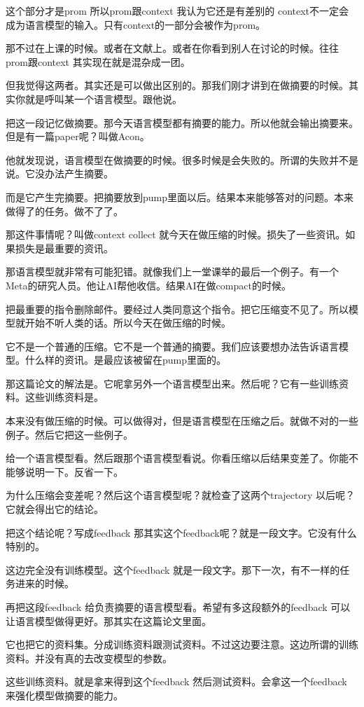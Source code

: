 \documentclass[12pt,a4paper]{article}
\begin{document}
这个部分才是prom 所以prom跟context 我认为它还是有差别的 context不一定会成为语言模型的输入。只有context的一部分会被作为prom。

那不过在上课的时候。或者在文献上。或者在你看到别人在讨论的时候。往往prom跟context 其实现在就是混杂成一团。

但我觉得这两者。其实还是可以做出区别的。那我们刚才讲到在做摘要的时候。其实你就是呼叫某一个语言模型。跟他说。

把这一段记忆做摘要。那今天语言模型都有摘要的能力。所以他就会输出摘要来。但是有一篇paper呢？叫做Acon。

他就发现说，语言模型在做摘要的时候。很多时候是会失败的。所谓的失败并不是说。它没办法产生摘要。

而是它产生完摘要。把摘要放到pump里面以后。结果本来能够答对的问题。本来做得了的任务。做不了了。

那这件事情呢？叫做context collect 就今天在做压缩的时候。损失了一些资讯。如果损失是最重要的资讯。

那语言模型就非常有可能犯错。就像我们上一堂课举的最后一个例子。有一个Meta的研究人员。他让AI帮他收信。结果AI在做compact的时候。

把最重要的指令删除邮件。要经过人类同意这个指令。把它压缩变不见了。所以模型就开始不听人类的话。所以今天在做压缩的时候。

它不是一个普通的压缩。它不是一个普通的摘要。我们应该要想办法告诉语言模型。什么样的资讯。是最应该被留在pump里面的。

那这篇论文的解法是。它呢拿另外一个语言模型出来。然后呢？它有一些训练资料。这些训练资料是。

本来没有做压缩的时候。可以做得对，但是语言模型在压缩之后。就做不对的一些例子。然后它把这一些例子。

给一个语言模型看。然后跟那个语言模型看说。你看压缩以后结果变差了。你能不能够说明一下。反省一下。

为什么压缩会变差呢？然后这个语言模型呢？就检查了这两个trajectory 以后呢？它就会得出它的结论。

把这个结论呢？写成feedback 那其实这个feedback呢？就是一段文字。它没有什么特别的。

这边完全没有训练模型。这个feedback 就是一段文字。那下一次，有不一样的任务进来的时候。

再把这段feedback 给负责摘要的语言模型看。希望有多这段额外的feedback 可以让语言模型做得更好。那其实在这篇论文里面。

它也把它的资料集。分成训练资料跟测试资料。不过这边要注意。这边所谓的训练资料。并没有真的去改变模型的参数。

这些训练资料。就是拿来得到这个feedback 然后测试资料。会拿这一个feedback 来强化模型做摘要的能力。
\end{document}
